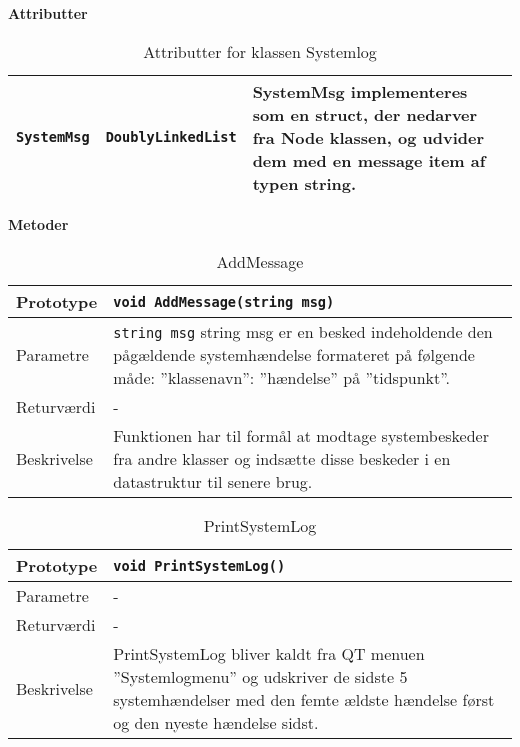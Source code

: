 \textbf{Attributter}

\begin{table}[h]
\begin{tabularx}{\textwidth}{| >{\raggedright\arraybackslash}X | >{\raggedright\arraybackslash}X | >{\raggedright\arraybackslash}p{10 cm} |} \hline
\texttt{SystemMsg} & \texttt{DoublyLinkedList} & SystemMsg implementeres som en struct, der nedarver fra Node klassen, og udvider dem med en message item af typen string. \\\hline
\end{tabularx}
\caption{Attributter for klassen Systemlog}
\label{table:Systemlog_attributter}
\end{table}

\textbf{Metoder}

\begin{table}[h]
\begin{tabularx}{\textwidth}{| >{\raggedright\arraybackslash}p{2.5 cm} | >{\raggedright\arraybackslash}X |} \hline
Prototype & \texttt{void AddMessage(string msg)} \\\hline
Parametre & \texttt{string msg} \newline
string msg er en besked indeholdende den pågældende systemhændelse formateret på følgende måde: ”klassenavn”: ”hændelse” på ”tidspunkt”. \\\hline
Returværdi & - \\\hline
Beskrivelse & Funktionen har til formål at modtage systembeskeder fra andre klasser og indsætte disse beskeder i en datastruktur til senere brug. \\\hline
\end{tabularx}
\caption{AddMessage}
\label{table:AddMessage}
\end{table}

\begin{table}[h]
\begin{tabularx}{\textwidth}{| >{\raggedright\arraybackslash}p{2.5 cm} | >{\raggedright\arraybackslash}X |} \hline
Prototype & \texttt{void PrintSystemLog()} \\\hline
Parametre & - \\\hline
Returværdi & - \\\hline
Beskrivelse & PrintSystemLog bliver kaldt fra QT menuen ”Systemlogmenu” og udskriver de sidste 5 systemhændelser med den femte ældste hændelse først og den nyeste hændelse sidst. \\\hline
\end{tabularx}
\caption{PrintSystemLog}
\label{table:PrintSystemLog}
\end{table}

